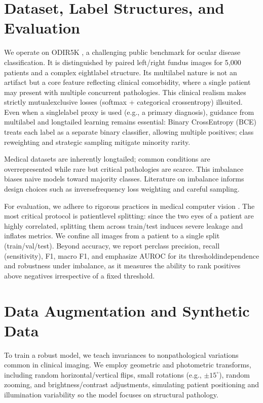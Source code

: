 \section{Dataset, Label Structures, and Evaluation}
We operate on ODIR\textendash 5K \cite{odir5k}, a challenging public benchmark for ocular disease classification. It is distinguished by paired left/right fundus images for 5{,}000 patients and a complex eight\textendash label structure. Its multi\textendash label nature is not an artifact but a core feature reflecting clinical comorbidity, where a single patient may present with multiple concurrent pathologies. This clinical realism makes strictly mutual\textendash exclusive losses (softmax + categorical cross\textendash entropy) ill\textendash suited. Even when a single\textendash label proxy is used (e.g., a primary diagnosis), guidance from multi\textendash label and long\textendash tailed learning \cite{docxRef62,docxRef63,docxRef64,docxRef65} remains essential: Binary Cross\textendash Entropy (BCE) treats each label as a separate binary classifier, allowing multiple positives; class re\textendash weighting and strategic sampling mitigate minority rarity.

Medical datasets are inherently long\textendash tailed; common conditions are over\textendash represented while rare but critical pathologies are scarce. This imbalance biases naive models toward majority classes. Literature on imbalance \cite{docxRef62,docxRef63} informs design choices such as inverse\textendash frequency loss weighting and careful sampling.

For evaluation, we adhere to rigorous practices in medical computer vision \cite{docxRef38,docxRef41}. The most critical protocol is patient\textendash level splitting: since the two eyes of a patient are highly correlated, splitting them across train/test induces severe leakage and inflates metrics. We confine all images from a patient to a single split (train/val/test). Beyond accuracy, we report per\textendash class precision, recall (sensitivity), F1, macro F1, and emphasize AUROC for its threshold\textendash independence and robustness under imbalance, as it measures the ability to rank positives above negatives irrespective of a fixed threshold.

\section{Data Augmentation and Synthetic Data}
To train a robust model, we teach invariances to non\textendash pathological variations common in clinical imaging. We employ geometric and photometric transforms, including random horizontal/vertical flips, small rotations (e.g., $\pm15^{\circ}$), random zooming, and brightness/contrast adjustments, simulating patient positioning and illumination variability so the model focuses on structural pathology.

